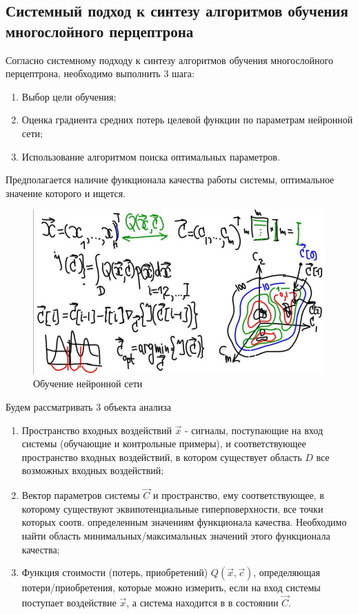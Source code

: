 \documentclass{article}
\numberwithin{equation}{subsection}
\begin{document}
\subsection{Системный подход к синтезу алгоритмов обучения многослойного перцептрона}

Согласно системному подходу к синтезу алгоритмов обучения многослойного перцептрона, 
необходимо выполнить 3 шага:
\begin{enumerate}
    \item Выбор цели обучения;
    \item Оценка градиента средних потерь целевой функции по параметрам нейронной сети;
    \item Использование алгоритмом поиска оптимальных параметров.
\end{enumerate}

Предполагается наличие функционала качества работы системы, оптимальное значение 
которого и ищется.

\begin{figure}[htbp]
    \centering
    \includegraphics[height=8 cm]{hyperflat_4_1.jpeg}
    \caption{Обучение нейронной сети}
    \label{hyperflat_4_1}
\end{figure}

Будем рассматривать 3 объекта анализа
\begin{enumerate}
    \item Пространство входных воздействий $\vec{x}$ - сигналы, поступающие на вход системы 
    (обучающие и контрольные примеры), и соответствующее пространство входных воздействий, 
    в котором существует область $D$ все возможных входных воздействий;
    \item Вектор параметров системы $\vec{C}$ и пространство, ему соответствующее, 
    в которому существуют эквипотенциальные гиперповерхности, все точки которых 
    соотв. определенным значениям функционала качества. Необходимо найти 
    область минимальных/максимальных значений этого функционала качества;
    \item Функция стоимости (потерь, приобретений) $Q(\vec{x}, \vec{c})$, 
    определяющая потери/приобретения, которые можно измерить, если на вход 
    системы поступает воздействие $\vec{x}$, а система находится в в состоянии $\vec{C}$.
\end{enumerate}
\end{document}

